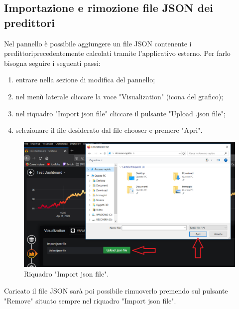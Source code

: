     \subsection{Importazione e rimozione file JSON dei predittori}
        Nel pannello è possibile aggiungere un file JSON contenente i predittori\glosp precedentemente calcolati tramite l'applicativo esterno. Per farlo bisogna seguire i seguenti passi:
        \begin{enumerate}
            \item entrare nella sezione di modifica del pannello;
            \item nel menù laterale cliccare la voce "Visualization" (icona del grafico);
            \item nel riquadro "Import json file" cliccare il pulsante "Upload .json file";
            \item selezionare il file desiderato dal file chooser e premere "Apri".
        \end{enumerate}
        \begin{figure}[H]
            \includegraphics[width=\textwidth,height=\textheight,keepaspectratio]{img/importazione_e_rimozione_JSON.png}
            \caption{Riquadro "Import json file".}
        \end{figure}
        Caricato il file JSON sarà poi possibile rimuoverlo premendo sul pulsante "Remove" situato sempre nel riquadro "Import json file".
